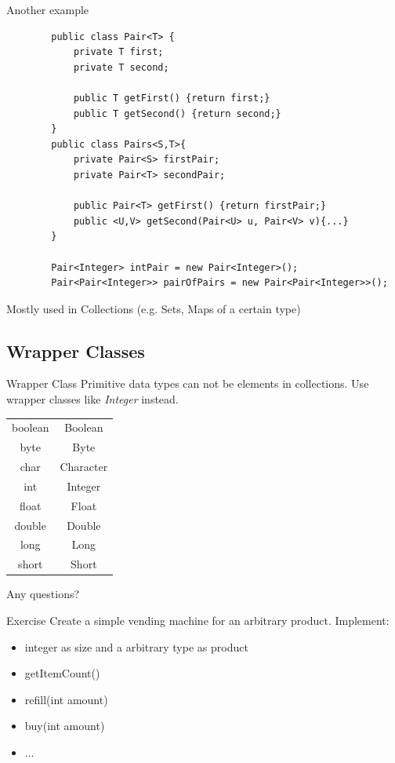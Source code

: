 \begin{frame}[fragile]{Another example}
	\begin{lstlisting}
		public class Pair<T> {
			private T first;
			private T second;
			
			public T getFirst() {return first;}
			public T getSecond() {return second;}
		}
		public class Pairs<S,T>{
			private Pair<S> firstPair;
			private Pair<T> secondPair;
			
			public Pair<T> getFirst() {return firstPair;}
			public <U,V> getSecond(Pair<U> u, Pair<V> v){...}
		}
		
		Pair<Integer> intPair = new Pair<Integer>();
		Pair<Pair<Integer>> pairOfPairs = new Pair<Pair<Integer>>();
	\end{lstlisting}
	Mostly used in Collections (e.g. Sets, Maps of a certain type)
\end{frame}


\subsection{Wrapper Classes}

\begin{frame}{Wrapper Class}
	Primitive data types can not be elements in collections. 
	Use wrapper classes like \emph{Integer} instead.
	\begin{center}
		\begin{tabular}{ c  c }
			boolean & Boolean \\
			byte & Byte \\
			char & Character \\
			int & Integer \\
			float & Float \\
			double & Double \\
			long & Long \\
			short & Short
		\end{tabular}
	\end{center}
	\pause
	\huge Any questions?
\end{frame}

\begin{frame}[fragile]{Exercise}
	Create a simple vending machine for an arbitrary product.
	Implement:
	\begin{itemize}
		\item integer as size and a arbitrary type as product
		\item getItemCount()
		\item refill(int amount)
		\item buy(int amount)
		\item ...
	\end{itemize}
\end{frame}

